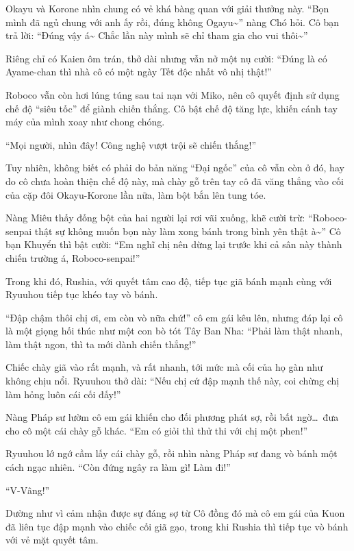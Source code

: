 \documentclass[../main.tex]{subfiles}
\begin{document}
Okayu và Korone nhìn chung có vẻ khá bàng quan với giải thưởng này. ``Bọn mình đã ngủ chung với anh ấy rồi, đúng không Ogayu\~{}'' nàng Chó hỏi. Cô bạn trả lời: ``Đúng vậy á\~{} Chắc lần này mình sẽ chỉ tham gia cho vui thôi\~{}''

Riêng chỉ có Kaien ôm trán, thở dài nhưng vẫn nở một nụ cười: ``Đúng là có Ayame-chan thì nhà cô có một ngày Tết độc nhất vô nhị thật!''

\ct

Roboco vẫn còn hơi lúng túng sau tai nạn với Miko, nên cô quyết định sử dụng chế độ ``siêu tốc'' để giành chiến thắng. Cô bật chế độ tăng lực, khiến cánh tay máy của mình xoay như chong chóng.

``Mọi người, nhìn đây! Công nghệ vượt trội sẽ chiến thắng!''

Tuy nhiên, không biết có phải do bản năng ``Đại ngốc'' của cô vẫn còn ở đó, hay do cô chưa hoàn thiện chế độ này, mà chày gỗ trên tay cô đã văng thẳng vào cối của cặp đôi Okayu-Korone lần nữa, làm bột bắn lên tung tóe.

Nàng Miêu thấy đống bột của hai người lại rơi vãi xuống, khẽ cười trừ: ``Roboco-senpai thật sự không muốn bọn này làm xong bánh trong bình yên thật à\~{}'' Cô bạn Khuyển thì bật cười: ``Em nghĩ chị nên dừng lại trước khi cả sân này thành chiến trường á, Roboco-senpai!''

Trong khi đó, Rushia, với quyết tâm cao độ, tiếp tục giã bánh mạnh cùng với Ryuuhou tiếp tục khéo tay vò bánh.

``Đập chậm thôi chị ơi, em còn vò nữa chứ!'' cô em gái kêu lên, nhưng đáp lại cô là một giọng hối thúc như một con bò tót Tây Ban Nha: ``Phải làm thật nhanh, làm thật ngon, thì ta mới dành chiến thắng!''

Chiếc chày giã vào rất mạnh, và rất nhanh, tới mức mà cối của họ gàn như không chịu nổi. Ryuuhou thở dài: ``Nếu chị cứ đập mạnh thế này, coi chừng chị làm hỏng luôn cái cối đấy!''

Nàng Pháp sư lườm cô em gái khiến cho đối phương phát sợ, rồi bất ngờ\dots\ đưa cho cô một cái chày gỗ khác. ``Em có giỏi thì thử thi với chị một phen!''

Ryuuhou lớ ngớ cầm lấy cái chày gỗ, rồi nhìn nàng Pháp sư đang vò bánh một cách ngạc nhiên. ``Còn đứng ngây ra làm gì! Làm đi!''

``V-Vâng!''

Dường như vì cảm nhận được sự đáng sợ từ Cô đồng đó mà cô em gái của Kuon đã liên tục đập mạnh vào chiếc cối giã gạo, trong khi Rushia thì tiếp tục vò bánh với vẻ mặt quyết tâm.
\end{document}
